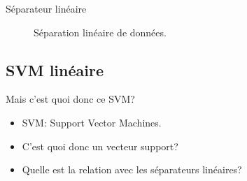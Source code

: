 \documentclass[8pt]{beamer}
\begin{document}
	\begin{frame}{Séparateur linéaire}
		\begin{figure}[H]
			{
				\caption{\label{fig::lin_separators} Séparation linéaire de données.}
			}
		\end{figure}
	\end{frame}

	\subsection[linear]{SVM linéaire}
	\begin{frame}{Mais c'est quoi donc ce SVM?}
		\begin{itemize}
			\item  SVM\@: Support Vector Machines.
			\item  C'est quoi donc un vecteur support?
			\item  Quelle est la relation avec les séparateurs linéaires?
		\end{itemize}
	\end{frame}
\end{document}
